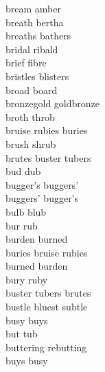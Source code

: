 bream amber\\
breath bertha\\
breaths bathers\\
bridal ribald\\
brief fibre\\
bristles blisters\\
broad board\\
bronzegold goldbronze\\
broth throb\\
bruise rubies buries\\
brush shrub\\
brutes buster tubers\\
bud dub\\
bugger's buggers'\\
buggers' bugger's\\
bulb blub\\
bur rub\\
burden burned\\
buries bruise rubies\\
burned burden\\
bury ruby\\
buster tubers brutes\\
bustle bluest subtle\\
busy buys\\
but tub\\
buttering rebutting\\
buys busy\\

